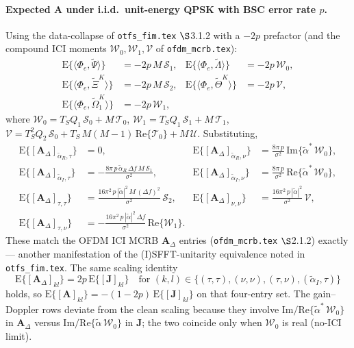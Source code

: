 \documentclass[11pt]{article}
\begin{document}
\paragraph{Expected \(\bm{A}\) under i.i.d.\ unit-energy QPSK with BSC error rate \(p\).} Using the data-collapse of \texttt{otfs\_fim.tex} \(\S\)3.1.2 with a \(-2p\) prefactor (and the compound ICI moments \(\mathcal{W}_0, \mathcal{W}_1, \mathcal{V}\) of \texttt{ofdm\_mcrb.tex}):
\begin{align}
    \mathrm{E}\{\langle \Phi_e, \tilde{\Psi}\rangle\} &= -2p\, M\, \mathcal{S}_1, &
    \mathrm{E}\{\langle \Phi_e, \tilde{\Lambda}\rangle\} &= -2p\, \mathcal{W}_0, \\
    \mathrm{E}\{\langle \Phi_e, \tilde{\Xi}^K\rangle\} &= -2p\, M\, \mathcal{S}_2, &
    \mathrm{E}\{\langle \Phi_e, \tilde{\Theta}^K\rangle\} &= -2p\, \mathcal{V}, \\
    \mathrm{E}\{\langle \Phi_e, \tilde{\Omega}_1^K\rangle\} &= -2p\, \mathcal{W}_1, & &
\end{align}
where \(\mathcal{W}_0 = T_S Q_1\, \mathcal{S}_0 + M\, \mathcal{T}_0\), \(\mathcal{W}_1 = T_S Q_1\, \mathcal{S}_1 + M\, \mathcal{T}_1\), \(\mathcal{V} = T_S^2 Q_2\, \mathcal{S}_0 + T_S\, M(M-1)\,\mathrm{Re}\{\mathcal{T}_0\} + M\, \mathcal{U}\). Substituting,
\begin{align}
    \mathrm{E}\{[\bm{A}_\Delta]_{\tilde{\alpha}_R, \tau}\} &= 0, &
    \mathrm{E}\{[\bm{A}_\Delta]_{\tilde{\alpha}_R, \nu}\} &= \tfrac{8\pi\, p}{\sigma^2}\, \mathrm{Im}\{\tilde{\alpha}^*\, \mathcal{W}_0\}, \\
    \mathrm{E}\{[\bm{A}_\Delta]_{\tilde{\alpha}_I, \tau}\} &= -\tfrac{8\pi\, p\, \tilde{\alpha}_R\, \Delta f\, M\, \mathcal{S}_1}{\sigma^2}, &
    \mathrm{E}\{[\bm{A}_\Delta]_{\tilde{\alpha}_I, \nu}\} &= \tfrac{8\pi\, p}{\sigma^2}\, \mathrm{Re}\{\tilde{\alpha}^*\, \mathcal{W}_0\}, \\
    \mathrm{E}\{[\bm{A}_\Delta]_{\tau, \tau}\} &= \tfrac{16\pi^2\, p\, |\tilde{\alpha}|^2\, M\, (\Delta f)^2}{\sigma^2}\, \mathcal{S}_2, &
    \mathrm{E}\{[\bm{A}_\Delta]_{\nu, \nu}\} &= \tfrac{16\pi^2\, p\, |\tilde{\alpha}|^2}{\sigma^2}\, \mathcal{V}, \\
    \mathrm{E}\{[\bm{A}_\Delta]_{\tau, \nu}\} &= -\tfrac{16\pi^2\, p\, |\tilde{\alpha}|^2\, \Delta f}{\sigma^2}\, \mathrm{Re}\{\mathcal{W}_1\}. & &
\end{align}
These match the OFDM ICI MCRB \(\bm{A}_\Delta\) entries (\texttt{ofdm\_mcrb.tex} \(\S\)2.1.2) exactly --- another manifestation of the (I)SFFT-unitarity equivalence noted in \texttt{otfs\_fim.tex}. The same scaling identity
\begin{equation}
    \mathrm{E}\{[\bm{A}_\Delta]_{kl}\} = 2p\, \mathrm{E}\{[\bm{J}]_{kl}\} \quad \text{for } (k,l) \in \{(\tau,\tau), (\nu,\nu), (\tau,\nu), (\tilde{\alpha}_I, \tau)\}
\end{equation}
holds, so \(\mathrm{E}\{[\bm{A}]_{kl}\} = -(1-2p)\, \mathrm{E}\{[\bm{J}]_{kl}\}\) on that four-entry set. The gain--Doppler rows deviate from the clean scaling because they involve \(\mathrm{Im/Re}\{\tilde\alpha^*\,\mathcal{W}_0\}\) in \(\bm{A}_\Delta\) versus \(\mathrm{Im/Re}\{\tilde\alpha\,\mathcal{W}_0\}\) in \(\bm{J}\); the two coincide only when \(\mathcal{W}_0\) is real (no-ICI limit).
\end{document}
